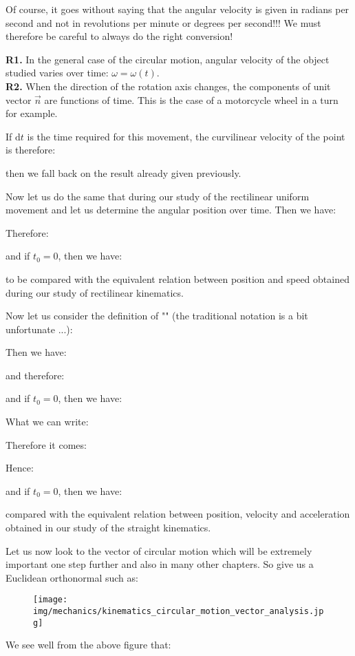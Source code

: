 	
	Of course, it goes without saying that the angular velocity is given in radians per second and not in revolutions per minute or degrees per second!!! We must therefore be careful to always do the right conversion!
	
	\begin{tcolorbox}[title=Remarks,colframe=black,arc=10pt]
	\textbf{R1.} In the general case of the circular motion, angular velocity of the object studied varies over time: $\omega=\omega(t)$.\\
	
	\textbf{R2.} When the direction of the rotation axis changes, the components of unit vector $\vec{n}$ are functions of time. This is the case of a motorcycle wheel in a turn for example.
	\end{tcolorbox}
	If $\mathrm{d}t$ is the time required for this movement, the curvilinear velocity of the point is therefore:
	
	then we fall back on the result already given previously.
	
	Now let us do the same that during our study of the rectilinear uniform movement and let us determine the angular position over time. Then we have:
	
	Therefore:
	
	and if $t_0=0$, then we have:
	
	to be compared with the equivalent relation between position and speed obtained during our study of rectilinear kinematics.
	
	Now let us consider the definition of "" (the traditional notation is a bit unfortunate ...):
	
	Then we have:
	
	and therefore:
	
	 and if $t_0=0$, then we have:
	
	What we can write:
	
	Therefore it comes:
	
	Hence:
	
	and if $t_0=0$, then we have:
	
	compared with the equivalent relation between position, velocity and acceleration obtained in our study of the straight kinematics.

Let us now look to the vector of circular motion which will be extremely important one step further and also in many other chapters. So give us a Euclidean orthonormal such as:
	\begin{figure}[H]
		\centering
		\texttt{[image: img/mechanics/kinematics\_circular\_motion\_vector\_analysis.jpg]}
	\end{figure}
	We see well from the above figure that:
	
